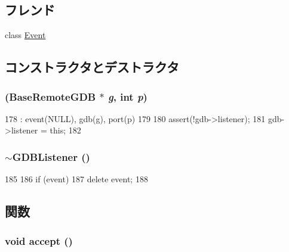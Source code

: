\subsection*{フレンド}
\begin{DoxyCompactItemize}
\item 
class \hyperlink{classGDBListener_a3c7b3c89bf96f51e80a919b3a82a3915}{Event}
\end{DoxyCompactItemize}


\subsection{コンストラクタとデストラクタ}
\hypertarget{classGDBListener_aa8b3c682f637e2fe4d93e2623219ee37}{
\subsubsection[{GDBListener}]{ ({\bf BaseRemoteGDB} $\ast$ {\em g}, \/  int {\em p})}}
\label{classGDBListener_aa8b3c682f637e2fe4d93e2623219ee37}



\begin{DoxyCode}
178     : event(NULL), gdb(g), port(p)
179 {
180     assert(!gdb->listener);
181     gdb->listener = this;
182 }
\end{DoxyCode}
\hypertarget{classGDBListener_afe14217db64403242d45b6e321a389a6}{
\subsubsection[{$\sim$GDBListener}]{\setlength{\rightskip}{0pt plus 5cm}$\sim${\bf GDBListener} ()}}
\label{classGDBListener_afe14217db64403242d45b6e321a389a6}



\begin{DoxyCode}
185 {
186     if (event)
187         delete event;
188 }
\end{DoxyCode}


\subsection{関数}
\hypertarget{classGDBListener_aadb9f3b844fb4cf98288cd3c60a3af91}{
\subsubsection[{accept}]{\setlength{\rightskip}{0pt plus 5cm}void accept ()}}
\label{classGDBListener_aadb9f3b844fb4cf98288cd3c60a3af91}



